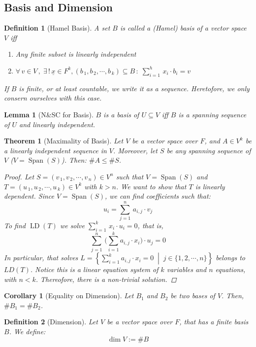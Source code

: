 \documentclass[12pt]{article}
\newcommand{\set}[2]{\left\{{#1}\;\middle|\;{#2}\right\}}
\newcommand{\Forall}[1]{\forall\,{#1}\,,\;}
\newcommand{\Exist}[1]{\exists\,{#1}\,:\;}
\newcommand{\tuple}[1]{\underline{#1}}
\newcommand{\seq}[2]{\left({#1}_{\,1},{#1}_{\,2},\cdots,{#1}_{\,#2}\right)}
\DeclareMathOperator{\Span}{Span}
\DeclareMathOperator{\LD}{LD}
\newtheorem{theorem}{Theorem}[subsection]
\newtheorem{definition}{Definition}[subsection]
\newtheorem{lemma}{Lemma}[subsection]
\newtheorem{corollary}{Corollary}[subsection]
\begin{document}
\subsection{Basis and Dimension}

\begin{definition}[Hamel Basis]
  A set $B$ is called a (Hamel) basis of a vector space $V$ iff
  \begin{enumerate}
    \item Any finite subset is linearly independent
    \item $\displaystyle\Forall{v\in V}\Exist{!\,\tuple{x}\in F^k,\seq{b}{k}\subseteq B}\sum_{i=1}^h\,x_i\cdot b_i=v$
  \end{enumerate}
  If $B$ is finite, or at least countable, we write it as a sequence. Heretofore, we only consern ourselves with this case.
\end{definition}

\begin{lemma}[N\&SC for Basis]
  $B$ is a basis of $U\subseteq V$ iff $B$ is a spanning sequence of $U$ and linearly independent.
\end{lemma}

\begin{theorem}[Maximality of Basis]
  Let $V$ be a vector space over $F$, and $A\in V^k$ be a linearly independent sequence in $V$. Moreover, let $S$ be any spanning sequence of $V$ ($V=\Span(S)$). Then: $\#A\leq \#S$.
  \begin{proof}
    Let $S=\seq{v}{n}\in V^n$ such that $V=\Span(S)$ and $T=\seq{u}{k}\in V^k$ with $k>n$. We want to show that $T$ is linearly dependent. Since $V=\Span(S)$, we can find coefficients such that: $$u_i=\sum_{j=1}^n\,a_{i,j}\cdot v_j$$
    To find $\LD(T)$ we solve $\displaystyle\sum_{i=1}^k\,x_i\cdot u_i=0$, that is, $$\sum_{j=1}^n\,\bigg(\sum_{i=1}^k a_{i,j}\cdot x_i\bigg)\cdot u_j=0 $$
    In particular, that solves $L=\set{\sum_{i=1}^k a_{i,j}\cdot x_i=0}{j\in\{1,2,\cdots,n\}}$ belongs to $LD(T)$. Notice this is a linear equation system of $k$ variables and $n$ equations, with $n<k$. Thereofore, there is a non-trivial solution.
  \end{proof}
\end{theorem}

\begin{corollary}[Equality on Dimension]
  Let $B_1$ and $B_2$ be two bases of $V$. Then, $\# B_1=\# B_2$.
\end{corollary}

\begin{definition}[Dimension]
  Let $V$ be a vector space over $F$, that has a finite basis $B$. We define: $$\boxed{\dim V:=\# B}$$
\end{definition}
\end{document}
